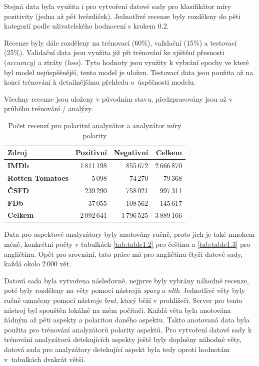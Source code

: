 Stejná data byla využita i pro vytvoření datové sady pro klasifikátor míry pozitivity (jedna až pět hvězdiček). Jednotlivé recenze byly rozděleny do pěti kategorií podle uživatelského hodnocení s krokem 0.2. 

Recenze byly dále rozděleny na trénovací (60\%), validační (15\%) a testovací (25\%). Validační data jsou využita již při trénování ke zjištění přesnosti (\emph{accuracy}) a ztráty (\emph{loss}). Tyto hodnoty jsou využity k vybrání epochy ve které byl model nejúspěšnější, tento model je uložen. Testovací data jsou použita až na konci trénování k detailnějšímu přehledu o~úspěšnosti modelu.

Všechny recenze jsou uloženy v původním stavu, předzpracovány jsou až v průběhu trénování / analýzy.




\FloatBarrier
\begin{table}[h!]
  \begin{center}
    \caption{Počet recenzí pro polaritní analyzátor a analyzátor míry polarity}
    \label{tab:table1.1}
    \begin{tabular}{l|r|r|r}
      \textbf{Zdroj} & \textbf{Pozitivní} & \textbf{Negativní} & \textbf{Celkem}\\ 
      \hline
      \textbf{IMDb} & 1\,811\,198 & 855\,672 & 2\,666\,870\\ 
      \textbf{Rotten Tomatoes} & 5\,098 & 74\,270 & 79\,368 \\ 
      \textbf{ČSFD} & 239\,290 & 758\,021 & 997\,311\\ 
      \textbf{FDb} & 37\,055 & 108\,562 & 145\,617\\ 
      \textbf{Celkem} & 2\,092\,641 & 1\,796\,525 & 3\,889\,166\\ 
    \end{tabular}
  \end{center}
\end{table}
\FloatBarrier
\FloatBarrier

Data pro aspektové analyzátory byly anotovány ručně, proto jich je také mnohem méně, konkrétní počty v tabulkách \ref{tab:table1.2} pro češtinu a \ref{tab:table1.3} pro angličtinu. Opět pro srovnání, tato práce \cite{en_dataset2} má pro angličtinu čtyři datové sady, každá okolo 2\,000 vět.

Datová sada byla vytvořena následovně, nejprve byly vybrány náhodné recenze, poté byly rozděleny na věty pomocí nástrojů \emph{spacy} a \emph{nltk}. Jednotlivé věty byly ručně označeny pomocí nástroje \emph{brat}, který běží v prohlížeči. Server pro tento nástroj byl spouštěn lokálně na mém počítači. Každá věta byla anotována žádným až pěti aspekty a polaritou daného aspektu. Takto anotovaná data byla použita pro trénování analyzátorů polarity aspektů. Pro vytvoření datové sady k trénování analyzátorů detekujících aspekty ještě byly doplněny náhodné věty, datová sada pro analyzátory detekující aspekt byla tedy oproti hodnotám v~tabulkách dvakrát větší. 

